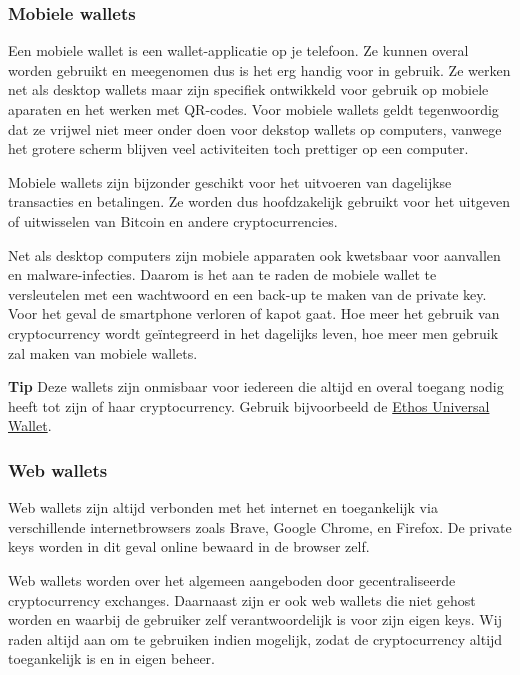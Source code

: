 \subsubsection[Mobiele wallets] {Mobiele wallets} 
Een mobiele wallet is een wallet-applicatie op je telefoon. Ze kunnen overal worden gebruikt en meegenomen dus is het erg handig voor in gebruik. Ze werken net als desktop wallets maar zijn specifiek ontwikkeld voor gebruik op mobiele aparaten en het werken met QR-codes. Voor mobiele wallets geldt tegenwoordig dat ze vrijwel niet meer onder doen voor dekstop wallets op computers, vanwege het grotere scherm blijven veel activiteiten toch prettiger op een computer. 

Mobiele wallets zijn bijzonder geschikt voor het uitvoeren van dagelijkse transacties en betalingen. Ze worden dus hoofdzakelijk gebruikt voor het uitgeven of uitwisselen van Bitcoin en andere cryptocurrencies. 

Net als desktop computers zijn mobiele apparaten ook kwetsbaar voor aanvallen en malware-infecties. Daarom is het aan te raden de mobiele wallet te versleutelen met een wachtwoord en een back-up te maken van de private key. Voor het geval de smartphone verloren of kapot gaat.
Hoe meer het gebruik van cryptocurrency wordt ge{\"i}ntegreerd in het dagelijks leven, hoe meer men gebruik zal maken van mobiele wallets.\medskip

\begin{tipbox}{\textbf{Tip}}
 Deze wallets zijn onmisbaar voor iedereen die altijd en overal toegang nodig heeft tot zijn of haar cryptocurrency.
\tcblower 
Gebruik bijvoorbeeld de \href{https://www.ethos.io/universal-wallet/}{Ethos Universal Wallet}.
\end{tipbox}

\subsubsection[Web wallets]{Web wallets}
Web wallets zijn altijd verbonden met het internet en toegankelijk via verschillende internetbrowsers zoals Brave, Google Chrome, en Firefox. De private keys worden in dit geval online bewaard in de browser zelf.  

Web wallets worden over het algemeen aangeboden door gecentraliseerde cryptocurrency exchanges. Daarnaast zijn er ook web wallets die niet gehost worden en waarbij de gebruiker zelf verantwoordelijk is voor zijn eigen keys. Wij raden altijd aan om  te gebruiken indien mogelijk, zodat de cryptocurrency altijd toegankelijk is en in eigen beheer.

